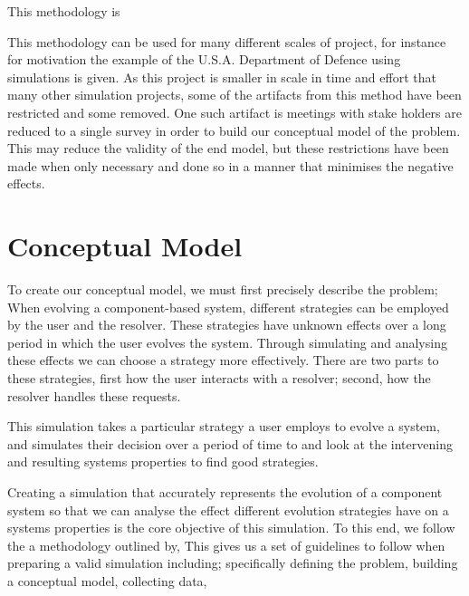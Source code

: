 This methodology is

This methodology can be used for many different scales of project, for instance for motivation the example of the U.S.A. Department of Defence using simulations is given.
As this project is smaller in scale in time and effort that many other simulation projects, some of the artifacts from this method have been restricted and some removed.
One such artifact is meetings with stake holders are reduced to a single survey in order to build our conceptual model of the problem.
This may reduce the validity of the end model, but these restrictions have been made when only necessary and done so in a manner that minimises the negative effects.


\section{Conceptual Model}
{}To create our conceptual model, we must first precisely describe the problem;
{}When evolving a component-based system, different strategies can be employed by the user and the resolver.
{}These strategies have unknown effects over a long period in which the user evolves the system.
{}Through simulating and analysing these effects we can choose a strategy more effectively.
{}There are two parts to these strategies, first how the user interacts with a resolver;
{}second, how the resolver handles these requests.

{}This simulation takes a particular strategy a user employs to evolve a system,
{}and simulates their decision over a period of time to and look at the intervening and resulting systems properties to find good strategies.

Creating a simulation that accurately represents the evolution of a component system so that we can 
analyse the effect different evolution strategies have on a systems properties is the core objective of this simulation.
To this end, we follow the a methodology outlined by, %
This gives us a set of guidelines to follow when preparing a valid simulation including;
specifically defining the problem,
building a conceptual model,
collecting data,

